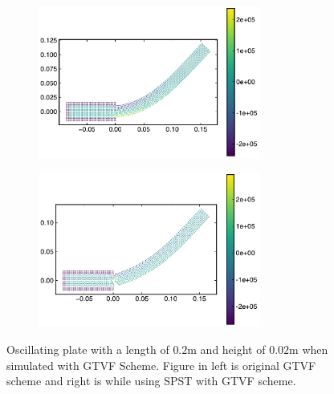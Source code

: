 %
%
\begin{figure}
  \centering
  \begin{subfigure}{0.48\textwidth}
    \centering
    \includegraphics[width=0.8\textwidth]{figures/ctvf/figures/oscillating_plate_gtvf/gtvf_original}
    \subcaption{}%
    \label{fig:oscillating-plate:gtvf-sun2019-a}
  \end{subfigure}
  \begin{subfigure}{0.48\textwidth}
    \centering
    \includegraphics[width=0.8\textwidth]{figures/ctvf/figures/oscillating_plate/gtvf_sun2019}
    \subcaption{}%
    \label{fig:oscillating-plate:gtvf-sun2019-b}
  \end{subfigure}
\caption{Oscillating plate with a length of $0.2$m and height of $0.02$m when
  simulated with GTVF Scheme. Figure in left is original GTVF scheme and right
  is while using SPST with GTVF scheme.}
\end{figure}
%



